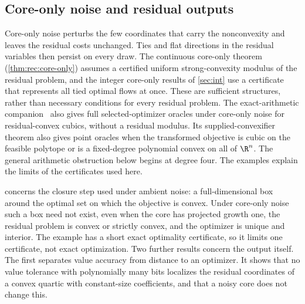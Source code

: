 \subsection{Core-only noise and residual outputs}\label{sec:lim:points}

Core-only noise perturbs the few coordinates that carry the nonconvexity
and leaves the residual costs unchanged. Ties and flat directions in the
residual variables then persist on every draw. The continuous core-only
theorem (\cref{thm:rec:core-only}) assumes a certified uniform
strong-convexity modulus of the residual problem, and the integer core-only
results of \cref{sec:int} use a certificate that represents all tied
optimal flows at once. These are sufficient structures, rather than
necessary conditions for every residual problem. The exact-arithmetic
companion~\citep{companion-exact-arithmetic} also gives full
selected-optimizer oracles under core-only noise for residual-convex cubics,
without a residual modulus. Its supplied-convexifier theorem also gives
point oracles when the transformed objective is cubic on the feasible
polytope or is a fixed-degree polynomial convex on all of $\R^n$.
The general arithmetic obstruction below begins at degree
four. The examples explain the limits of the certificates used here.

 concerns the closure step used under ambient noise: a
full-dimensional box around the optimal set on which the objective is
convex. Under core-only noise such a box need not exist, even when the core
has projected growth one, the residual problem is convex or strictly convex,
and the optimizer is unique and interior. The example has a short exact
optimality certificate, so it limits one certificate, not exact
optimization. Two further results concern the output itself. The first
separates value accuracy from distance to an optimizer. It shows that no
value tolerance with polynomially many bits localizes the residual
coordinates of a convex quartic with constant-size coefficients, and that a
noisy core does not change this.

